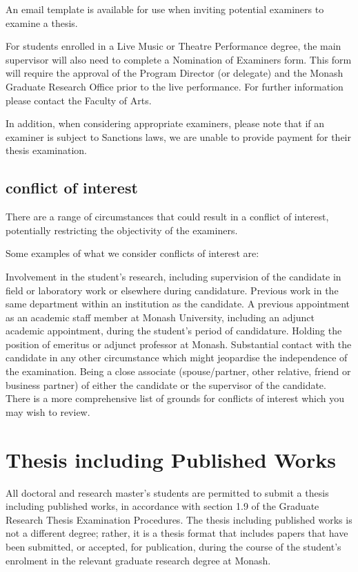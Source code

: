 An email template is available for use when inviting potential examiners to examine a thesis.

For students enrolled in a Live Music or Theatre Performance degree, the main supervisor will also need to complete a Nomination of Examiners form. This form will require the approval of the Program Director (or delegate) and the Monash Graduate Research Office prior to the live performance. For further information please contact the Faculty of Arts.

In addition, when considering appropriate examiners, please note that if an examiner is subject to Sanctions laws, we are unable to provide payment for their thesis examination.

\subsection{conflict of interest}
There are a range of circumstances that could result in a conflict of interest, potentially restricting the objectivity of the examiners.

Some examples of what we consider conflicts of interest are:

Involvement in the student's research, including supervision of the candidate in field or laboratory work or elsewhere during candidature.
Previous work in the same department within an institution as the candidate.
A previous appointment as an academic staff member at Monash University, including an adjunct academic appointment, during the student’s period of candidature.
Holding the position of emeritus or adjunct professor at Monash.
Substantial contact with the candidate in any other circumstance which might jeopardise the independence of the examination.
Being a close associate (spouse/partner, other relative, friend or business partner) of either the candidate or the supervisor of the candidate.
There is a more comprehensive list of grounds for conflicts of interest which you may wish to review.


\section{Thesis including Published Works}
All doctoral and research master's students are permitted to submit a thesis including published works, in accordance with section 1.9 of the Graduate Research Thesis Examination Procedures. The thesis including published works is not a different degree; rather, it is a thesis format that includes papers that have been submitted, or accepted, for publication, during the course of the student's enrolment in the relevant graduate research degree at Monash.

